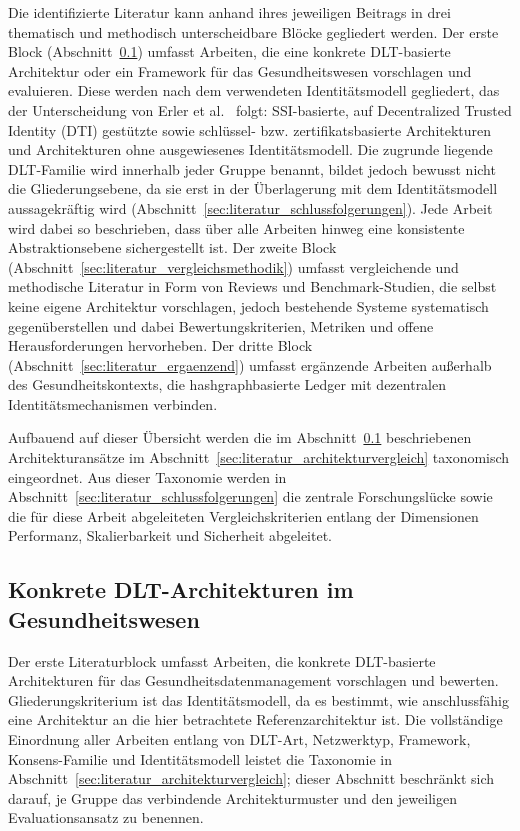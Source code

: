Die identifizierte Literatur kann anhand ihres jeweiligen Beitrags in drei thematisch und methodisch unterscheidbare Blöcke gegliedert werden. Der erste Block (Abschnitt~\ref{sec:literatur_architectures}) umfasst Arbeiten, die eine konkrete DLT-basierte Architektur oder ein Framework für das Gesundheitswesen vorschlagen und evaluieren. Diese werden nach dem verwendeten Identitätsmodell gegliedert, das der Unterscheidung von Erler et al.~\cite{erler2024} folgt: SSI-basierte, auf Decentralized Trusted Identity (DTI) gestützte sowie schlüssel- bzw. zertifikatsbasierte Architekturen und Architekturen ohne ausgewiesenes Identitätsmodell. Die zugrunde liegende DLT-Familie wird innerhalb jeder Gruppe benannt, bildet jedoch bewusst nicht die Gliederungsebene, da sie erst in der Überlagerung mit dem Identitätsmodell aussagekräftig wird (Abschnitt~\ref{sec:literatur_schlussfolgerungen}). Jede Arbeit wird dabei so beschrieben, dass über alle Arbeiten hinweg eine konsistente Abstraktionsebene sichergestellt ist. Der zweite Block (Abschnitt~\ref{sec:literatur_vergleichsmethodik}) umfasst vergleichende und methodische Literatur in Form von Reviews und Benchmark-Studien, die selbst keine eigene Architektur vorschlagen, jedoch bestehende Systeme systematisch gegenüberstellen und dabei Bewertungskriterien, Metriken und offene Herausforderungen hervorheben. Der dritte Block (Abschnitt~\ref{sec:literatur_ergaenzend}) umfasst ergänzende Arbeiten außerhalb des Gesundheitskontexts, die hashgraphbasierte Ledger mit dezentralen Identitätsmechanismen verbinden.

Aufbauend auf dieser Übersicht werden die im Abschnitt~\ref{sec:literatur_architectures} beschriebenen Architekturansätze im Abschnitt~\ref{sec:literatur_architekturvergleich} taxonomisch eingeordnet. Aus dieser Taxonomie werden in Abschnitt~\ref{sec:literatur_schlussfolgerungen} die zentrale Forschungslücke sowie die für diese Arbeit abgeleiteten Vergleichskriterien entlang der Dimensionen Performanz, Skalierbarkeit und Sicherheit abgeleitet.

\subsection{Konkrete DLT-Architekturen im Gesundheitswesen}
\label{sec:literatur_architectures}
Der erste Literaturblock umfasst Arbeiten, die konkrete DLT-basierte Architekturen für das Gesundheitsdatenmanagement vorschlagen und bewerten. Gliederungskriterium ist das Identitätsmodell, da es bestimmt, wie anschlussfähig eine Architektur an die hier betrachtete Referenzarchitektur ist. Die vollständige Einordnung aller Arbeiten entlang von DLT-Art, Netzwerktyp, Framework, Konsens-Familie und Identitätsmodell leistet die Taxonomie in Abschnitt~\ref{sec:literatur_architekturvergleich}; dieser Abschnitt beschränkt sich darauf, je Gruppe das verbindende Architekturmuster und den jeweiligen Evaluationsansatz zu benennen.

